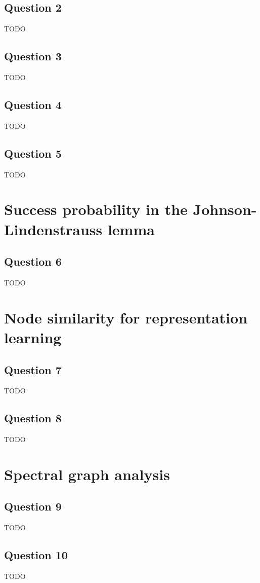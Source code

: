 \documentclass{article}
\begin{document}
\subsection{Question 2}
TODO

\subsection{Question 3}
TODO

\subsection{Question 4}
TODO

\subsection{Question 5}
TODO

\section{Success probability in the Johnson-Lindenstrauss lemma}

\subsection{Question 6}
TODO

\section{Node similarity for representation learning}

\subsection{Question 7}
TODO

\subsection{Question 8}
TODO

\section{Spectral graph analysis}

\subsection{Question 9}
TODO

\subsection{Question 10}
TODO
\end{document}
